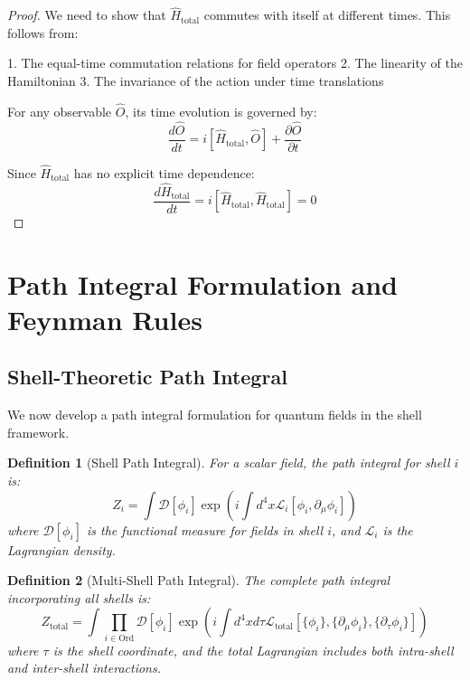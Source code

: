 \documentclass[12pt,a4paper]{article}
\newtheorem{definition}{Definition}[section]
\newcommand{\D}{\mathcal{D}}
\newcommand{\Lagr}{\mathcal{L}}
\begin{document}
\begin{proof}
We need to show that $\hat{H}_{\text{total}}$ commutes with itself at different times. This follows from:

1. The equal-time commutation relations for field operators
2. The linearity of the Hamiltonian
3. The invariance of the action under time translations

For any observable $\hat{O}$, its time evolution is governed by:
\begin{equation}
\frac{d\hat{O}}{dt} = i[\hat{H}_{\text{total}}, \hat{O}] + \frac{\partial \hat{O}}{\partial t}
\end{equation}

Since $\hat{H}_{\text{total}}$ has no explicit time dependence:
\begin{equation}
\frac{d\hat{H}_{\text{total}}}{dt} = i[\hat{H}_{\text{total}}, \hat{H}_{\text{total}}] = 0
\end{equation}
\end{proof}

\section{Path Integral Formulation and Feynman Rules}
\label{sec:path-integral}

\subsection{Shell-Theoretic Path Integral}
\label{subsec:shell-path-integral}

We now develop a path integral formulation for quantum fields in the shell framework.

\begin{definition}[Shell Path Integral]
\label{def:shell-path-integral}
For a scalar field, the path integral for shell $i$ is:
\begin{equation}
Z_i = \int \D[\phi_i] \exp\left(i\int d^4x \Lagr_i[\phi_i, \partial_\mu\phi_i]\right)
\end{equation}
where $\D[\phi_i]$ is the functional measure for fields in shell $i$, and $\Lagr_i$ is the Lagrangian density.
\end{definition}

\begin{definition}[Multi-Shell Path Integral]
\label{def:multi-shell-path-integral}
The complete path integral incorporating all shells is:
\begin{equation}
Z_{\text{total}} = \int \prod_{i \in \text{Ord}} \D[\phi_i] \exp\left(i\int d^4x d\tau \Lagr_{\text{total}}[\{\phi_i\}, \{\partial_\mu\phi_i\}, \{\partial_\tau\phi_i\}]\right)
\end{equation}
where $\tau$ is the shell coordinate, and the total Lagrangian includes both intra-shell and inter-shell interactions.
\end{definition}
\end{document}
